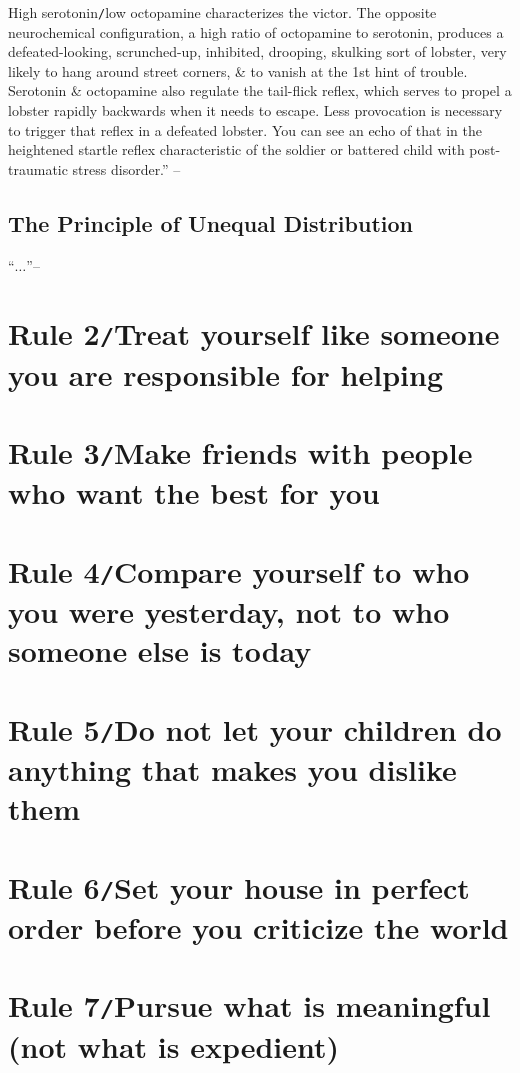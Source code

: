 \documentclass[oneside]{book}
\numberwithin{equation}{section}
\begin{document}
High serotonin\texttt{/}low octopamine characterizes the victor. The opposite neurochemical configuration, a high ratio of octopamine to serotonin, produces a defeated-looking, scrunched-up, inhibited, drooping, skulking sort of lobster, very likely to hang around street corners, \& to vanish at the 1st hint of trouble. Serotonin \& octopamine also regulate the tail-flick reflex, which serves to propel a lobster rapidly backwards when it needs to escape. Less provocation is necessary to trigger that reflex in a defeated lobster. You can see an echo of that in the heightened startle reflex characteristic of the soldier or battered child with post-traumatic stress disorder.'' -- \cite[pp. 36--37]{Peterson2018}

\subsection{The Principle of Unequal Distribution}
``$\ldots$''-- \cite[pp. 37--38]{Peterson2018}

\section{Rule 2\texttt{/}Treat yourself like someone you are responsible for helping}

\section{Rule 3\texttt{/}Make friends with people who want the best for you}

\section{Rule 4\texttt{/}Compare yourself to who you were yesterday, not to who someone else is today}

\section{Rule 5\texttt{/}Do not let your children do anything that makes you dislike them}

\section{Rule 6\texttt{/}Set your house in perfect order before you criticize the world}

\section{Rule 7\texttt{/}Pursue what is meaningful (not what is expedient)}
\end{document}
